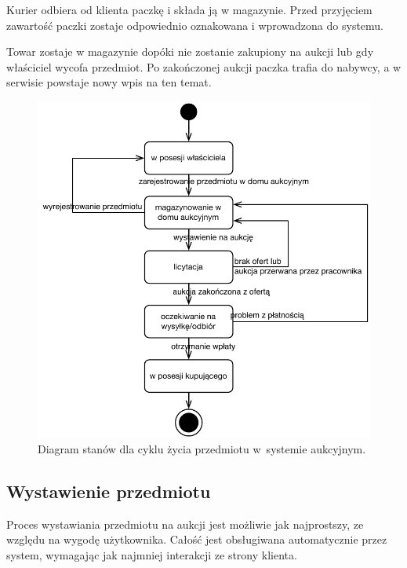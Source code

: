 \documentclass[10pt,a4paper]{article}
\begin{document}
Kurier odbiera od klienta paczkę i składa ją w magazynie. Przed przyjęciem
zawartość paczki zostaje odpowiednio oznakowana i wprowadzona do systemu.

Towar zostaje w magazynie dopóki nie zostanie zakupiony na aukcji lub gdy
właściciel wycofa przedmiot. Po zakończonej aukcji paczka trafia do nabywcy, a
w serwisie powstaje nowy wpis na ten temat.

\begin{figure}[hb]
  \begin{adjustwidth}{-3cm}{-3cm}
    \centering
    \includegraphics{figury/stan-przedmiot}
    \caption{Diagram stanów dla cyklu życia przedmiotu w~systemie aukcyjnym.}
    \label{fig:stan_przedmiot}
  \end{adjustwidth}
\end{figure}
\clearpage

\subsection{Wystawienie przedmiotu}

Proces wystawiania przedmiotu na aukcji jest możliwie jak najprostszy, ze
względu na wygodę użytkownika. Całość jest obsługiwana automatycznie przez
system, wymagając jak najmniej interakcji ze strony klienta.
\end{document}
